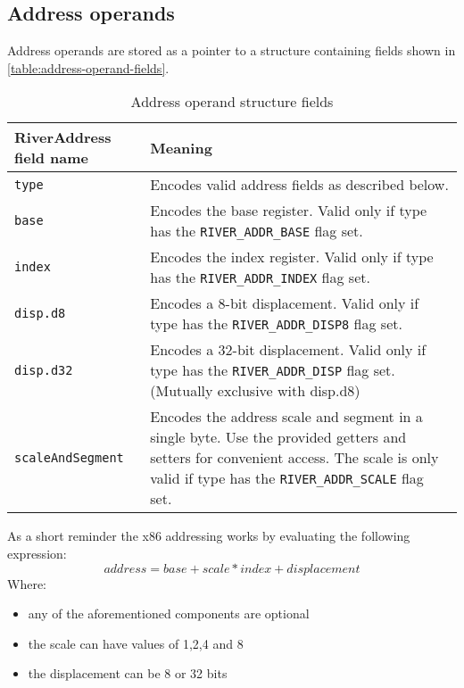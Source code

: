 \documentclass[12pt]{report}
\begin{document}
\subsection{Address operands}
\label{ssec:address-operands}
Address operands are stored as a pointer to a structure containing fields shown in \autoref{table:address-operand-fields}.\\
\begin{table}[H]
	\begin{tabular}{| p{6cm} | p{10cm} |}
		\hline
		\textbf{RiverAddress field name} & \textbf{Meaning}\\ \hline
		\texttt{type} & Encodes valid address fields as described below.\\ \hline
		\texttt{base} & Encodes the base register. Valid only if type has the \texttt{RIVER_ADDR_BASE} flag set.\\ \hline
		\texttt{index} & Encodes the index register. Valid only if type has the \texttt{RIVER_ADDR_INDEX} flag set.\\ \hline
		\texttt{disp.d8} & Encodes a 8-bit displacement. Valid only if type has the \texttt{RIVER_ADDR_DISP8} flag set.\\ \hline
		\texttt{disp.d32} & Encodes a 32-bit displacement. Valid only if type has the \texttt{RIVER_ADDR_DISP} flag set. (Mutually exclusive with disp.d8)\\ \hline
		\texttt{scaleAndSegment} & Encodes the address scale and segment in a single byte. Use the provided getters and setters for convenient access. The scale is only valid if type has the \texttt{RIVER_ADDR_SCALE} flag set.\\ \hline
	\end{tabular}
	\caption{Address operand structure fields}
	\label{table:address-operand-fields}
\end{table}
As a short reminder the x86 addressing works by evaluating the following expression:\\
\[address = base + scale * index + displacement\]
Where:
\begin{itemize}
	\item any of the aforementioned components are optional
	\item the scale can have values of 1,2,4 and 8
	\item the displacement can be 8 or 32 bits
\end{itemize}
\end{document}

